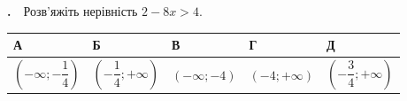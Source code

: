 \documentclass[12pt]{article}
\newlength{\nmtcellw}
\newcommand{\nmtSetCell}{\setlength{\nmtcellw}{\dimexpr(\linewidth-10\tabcolsep-6\arrayrulewidth)/5\relax}}
\newcommand{\answerTableTall}[5]{%
\par\nopagebreak\vspace{0.15cm}
\noindent\nmtSetCell
\begin{tabular}{|*{5}{>{\centering\arraybackslash}m{\nmtcellw}|}}
\hline
\rule[-0.2cm]{0pt}{0.7cm}\textbf{А} & \rule[-0.2cm]{0pt}{0.7cm}\textbf{Б} & \rule[-0.2cm]{0pt}{0.7cm}\textbf{В} & \rule[-0.2cm]{0pt}{0.7cm}\textbf{Г} & \rule[-0.2cm]{0pt}{0.7cm}\textbf{Д} \\
\hline
\rule[-0.45cm]{0pt}{1.2cm}#1 & \rule[-0.45cm]{0pt}{1.2cm}#2 & \rule[-0.45cm]{0pt}{1.2cm}#3 & \rule[-0.45cm]{0pt}{1.2cm}#4 & \rule[-0.45cm]{0pt}{1.2cm}#5 \\
\hline
\end{tabular}
\par\vspace{0.25cm}
}
\newcommand{\matchingGrid}{%
    \sbox{\nmtgridbox}{\matchingGridRaw}%
    \ifdim\wd\nmtgridbox>\linewidth \resizebox{\linewidth}{!}{\usebox{\nmtgridbox}}\else\usebox{\nmtgridbox}\fi}
\newcommand{\matchingGridRaw}{%
    \begingroup
    \renewcommand{\arraystretch}{1.15}
    \setlength{\tabcolsep}{4pt}
    \footnotesize
    \begin{tabular}{r|c|c|c|c|c|}
         \multicolumn{1}{c}{} & \multicolumn{1}{c}{\textbf{А}} & \multicolumn{1}{c}{\textbf{Б}} & \multicolumn{1}{c}{\textbf{В}} & \multicolumn{1}{c}{\textbf{Г}} & \multicolumn{1}{c}{\textbf{Д}} \\ \cline{2-6}
         \textbf{1} & \phantom{X} & \phantom{X} & \phantom{X} & \phantom{X} & \phantom{X} \\ \cline{2-6}
         \textbf{2} & & & & & \\ \cline{2-6}
         \textbf{3} & & & & & \\ \cline{2-6}
    \end{tabular}
    \endgroup
}
\newcounter{zad}
\newcommand{\zadnum}{\stepcounter{zad}\textbf{\thezad.}\ \ }
\newcounter{ans}
\newcommand{\nmtnobreak}{\ifvmode\penalty10000 \fi}
\begin{document}
\providecommand{\trigStyle}[1]{#1}
\providecommand{\answerTableSmall}[5]{%
\begingroup\setlength{\tabcolsep}{2pt}\small\nmtSetCell
\begin{tabular}{|*{5}{>{\centering\arraybackslash}m{\nmtcellw}|}}
\hline
\rule[-0.2cm]{0pt}{0.6cm}\textbf{А} & \textbf{Б} & \textbf{В} & \textbf{Г} & \textbf{Д} \\
\hline
\rule[-0.4cm]{0pt}{0.9cm}#1 & \rule[-0.4cm]{0pt}{0.9cm}#2 & \rule[-0.4cm]{0pt}{0.9cm}#3 & \rule[-0.4cm]{0pt}{0.9cm}#4 & \rule[-0.4cm]{0pt}{0.9cm}#5 \\
\hline
\end{tabular}\endgroup}
\providecommand{\matchingLayout}[3]{%
    \noindent
    \begin{minipage}[t]{0.36\textwidth}\vspace{0pt}\raggedright
        #1
    \end{minipage}%
    \hfill
    \begin{minipage}[t]{0.43\textwidth}\vspace{0pt}\raggedright
        #2
    \end{minipage}%
    \hfill
    \begin{minipage}[t]{0.19\textwidth}
        \vspace{0pt}
        \begin{flushright}
        #3
        \end{flushright}
    \end{minipage}}
\providecommand{\matchingLayoutBottom}[2]{%
    \noindent
    \begin{minipage}[t]{0.48\textwidth}\vspace{0pt}\raggedright
        #1
    \end{minipage}%
    \hfill
    \begin{minipage}[t]{0.48\textwidth}\vspace{0pt}\raggedright
        #2
    \end{minipage}
    \vspace{0.5cm}
    \noindent
    \matchingGrid}
\providecommand{\answerListVertical}[5]{%
    \par\nopagebreak\vspace{0.2cm}
    \begin{itemize}[itemsep=0.4cm, leftmargin=1.5cm, labelsep=0.5cm]
        \item[\textbf{А}] #1
        \item[\textbf{Б}] #2
        \item[\textbf{В}] #3
        \item[\textbf{Г}] #4
        \item[\textbf{Д}] #5
    \end{itemize}
    \vspace{0.2cm}}
\begin{samepage}
\noindent\zadnum Розв'яжіть нерівність $2 - 8x > 4$.

\nmtnobreak
\answerTableTall{$\left(-\infty; -\dfrac{1}{4}\right)$}{$\left(-\dfrac{1}{4}; +\infty\right)$}{$(-\infty; -4)$}{$(-4; +\infty)$}{$\left(-\dfrac{3}{4}; +\infty\right)$}
\par{}
\end{samepage}
\endgroup
\end{document}
